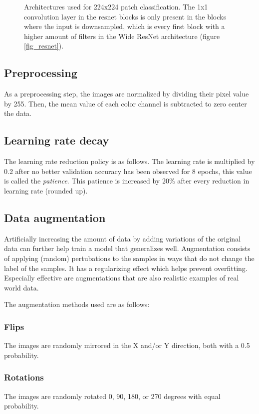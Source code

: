 \documentclass[journal]{IEEEtran}
\begin{document}
\begin{figure}[!t]
{\label{fig_vgg}}
\caption{Architectures used for 224x224 patch classification. The 1x1 convolution layer in the resnet blocks is only present in the blocks where the input is downsampled, which is every first block with a higher amount of filters in the Wide ResNet architecture (figure \ref{fig_resnet}).}
\label{fig_architectures}
\end{figure}




\subsection{Preprocessing}
As a preprocessing step, the images are normalized by dividing their pixel value by 255. Then, the mean value of each color channel is subtracted to zero center the data.

\subsection{Learning rate decay}
The learning rate reduction policy is as follows. The learning rate is multiplied by 0.2 after no better validation accuracy has been observed for 8 epochs, this value is called the \emph{patience}. This patience is increased by 20\% after every reduction in learning rate (rounded up).  

\subsection{Data augmentation}
Artificially increasing the amount of data by adding variations of the original data can further help train a model that generalizes well. Augmentation consists of applying (random) pertubations to the samples in ways that do not change the label of the samples. It has a regularizing effect which helps prevent overfitting. Especially effective are augmentations that are also realistic examples of real world data.

\medskip

The augmentation methods used are as follows:

\subsubsection{Flips}
The images are randomly mirrored in the X and/or Y direction, both with a 0.5 probability. 

\subsubsection{Rotations}
The images are randomly rotated 0, 90, 180, or 270 degrees with equal probability.
\end{document}
